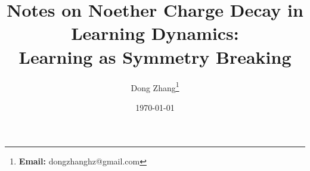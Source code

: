\documentclass[11pt]{article}
\begin{document}
\title{Notes on Noether Charge Decay in Learning Dynamics:\\
       Learning as Symmetry Breaking}

\author{Dong Zhang\thanks{\textbf{Email:} dongzhanghz@gmail.com}}
\date{\today}
\maketitle

\newcommand{\Wone}{W_1}
\newcommand{\Wtwo}{W_2}
\newcommand{\Cmat}{C}
\newcommand{\trace}{\operatorname{tr}}
\newcommand{\norm}[1]{\left\lVert #1 \right\rVert}

\end{document}
